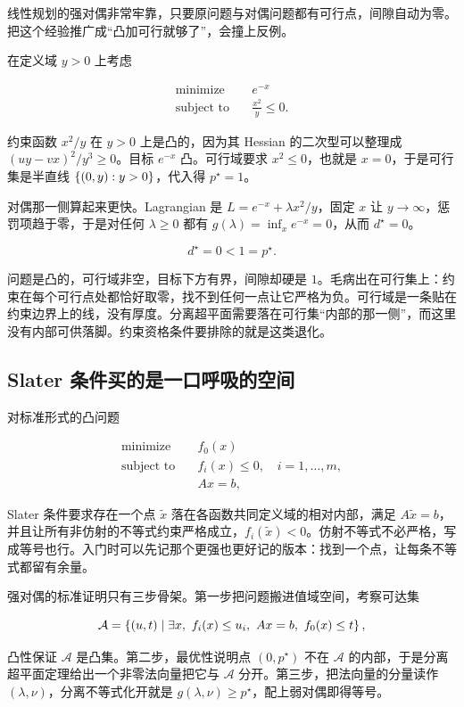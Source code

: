 线性规划的强对偶非常牢靠，只要原问题与对偶问题都有可行点，间隙自动为零。把这个经验推广成``凸加可行就够了''，会撞上反例。

在定义域 \(y>0\) 上考虑

\[
\begin{aligned}
\text{minimize}\quad&e^{-x}\\
\text{subject to}\quad&\frac{x^2}{y}\le0.
\end{aligned}
\]

约束函数 \(x^2/y\) 在 \(y>0\) 上是凸的，因为其 Hessian 的二次型可以整理成 \((uy-vx)^2/y^3\ge0\)。目标 \(e^{-x}\) 凸。可行域要求 \(x^2\le0\)，也就是 \(x=0\)，于是可行集是半直线 \(\left\{(0,y):y>0\right\}\)，代入得 \(p^\star=1\)。

对偶那一侧算起来更快。Lagrangian 是 \(L=e^{-x}+\lambda x^2/y\)，固定 \(x\) 让 \(y\to\infty\)，惩罚项趋于零，于是对任何 \(\lambda\ge0\) 都有 \(g(\lambda)=\inf_x e^{-x}=0\)，从而 \(d^\star=0\)。

\[
d^\star=0<1=p^\star.
\]

问题是凸的，可行域非空，目标下方有界，间隙却硬是 \(1\)。毛病出在可行集上：约束在每个可行点处都恰好取零，找不到任何一点让它严格为负。可行域是一条贴在约束边界上的线，没有厚度。分离超平面需要落在可行集``内部的那一侧''，而这里没有内部可供落脚。约束资格条件要排除的就是这类退化。

\subsection{Slater 条件买的是一口呼吸的空间}

对标准形式的凸问题

\[
\begin{aligned}
\text{minimize}\quad&f_0(x)\\
\text{subject to}\quad&f_i(x)\le0,\quad i=1,\ldots,m,\\
&Ax=b,
\end{aligned}
\]

Slater 条件要求存在一个点 \(\tilde x\) 落在各函数共同定义域的相对内部，满足 \(A\tilde x=b\)，并且让所有非仿射的不等式约束严格成立，\(f_i(\tilde x)<0\)。仿射不等式不必严格，写成等号也行。入门时可以先记那个更强也更好记的版本：找到一个点，让每条不等式都留有余量。

强对偶的标准证明只有三步骨架。第一步把问题搬进值域空间，考察可达集

\[
\mathcal{A}=\set{(u,t)\mid\exists x,\ f_i(x)\le u_i,\ Ax=b,\ f_0(x)\le t},
\]

凸性保证 \(\mathcal{A}\) 是凸集。第二步，最优性说明点 \((0,p^\star)\) 不在 \(\mathcal{A}\) 的内部，于是分离超平面定理给出一个非零法向量把它与 \(\mathcal{A}\) 分开。第三步，把法向量的分量读作 \((\lambda,\nu)\)，分离不等式化开就是 \(g(\lambda,\nu)\ge p^\star\)，配上弱对偶即得等号。

